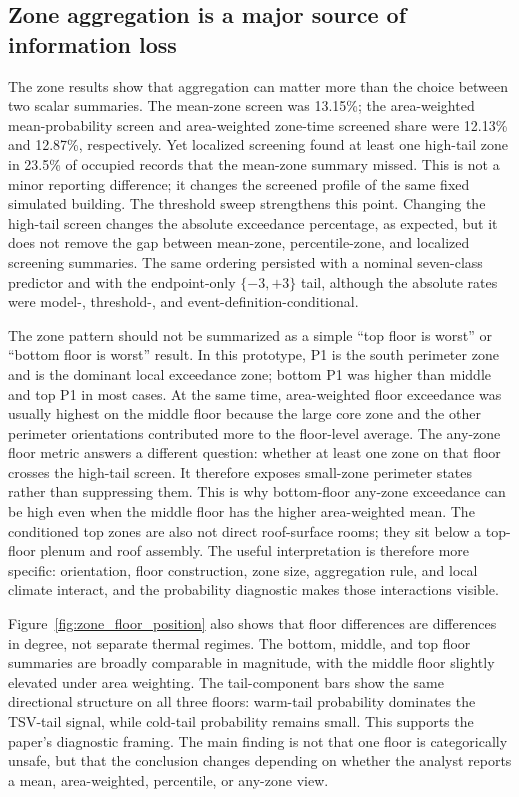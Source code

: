 \subsection{Zone aggregation is a major source of information loss}

The zone results show that aggregation can matter more than the choice between two scalar summaries. The mean-zone screen was 13.15\%; the area-weighted mean-probability screen and area-weighted zone-time screened share were 12.13\% and 12.87\%, respectively. Yet localized screening found at least one high-tail zone in 23.5\% of occupied records that the mean-zone summary missed. This is not a minor reporting difference; it changes the screened profile of the same fixed simulated building. The threshold sweep strengthens this point. Changing the high-tail screen changes the absolute exceedance percentage, as expected, but it does not remove the gap between mean-zone, percentile-zone, and localized screening summaries. The same ordering persisted with a nominal seven-class predictor and with the endpoint-only $\{-3,+3\}$ tail, although the absolute rates were model-, threshold-, and event-definition-conditional.

The zone pattern should not be summarized as a simple ``top floor is worst'' or ``bottom floor is worst'' result. In this prototype, P1 is the south perimeter zone and is the dominant local exceedance zone; bottom P1 was higher than middle and top P1 in most cases. At the same time, area-weighted floor exceedance was usually highest on the middle floor because the large core zone and the other perimeter orientations contributed more to the floor-level average. The any-zone floor metric answers a different question: whether at least one zone on that floor crosses the high-tail screen. It therefore exposes small-zone perimeter states rather than suppressing them. This is why bottom-floor any-zone exceedance can be high even when the middle floor has the higher area-weighted mean. The conditioned top zones are also not direct roof-surface rooms; they sit below a top-floor plenum and roof assembly. The useful interpretation is therefore more specific: orientation, floor construction, zone size, aggregation rule, and local climate interact, and the probability diagnostic makes those interactions visible.

Figure~\ref{fig:zone_floor_position} also shows that floor differences are differences in degree, not separate thermal regimes. The bottom, middle, and top floor summaries are broadly comparable in magnitude, with the middle floor slightly elevated under area weighting. The tail-component bars show the same directional structure on all three floors: warm-tail probability dominates the TSV-tail signal, while cold-tail probability remains small. This supports the paper's diagnostic framing. The main finding is not that one floor is categorically unsafe, but that the conclusion changes depending on whether the analyst reports a mean, area-weighted, percentile, or any-zone view.

